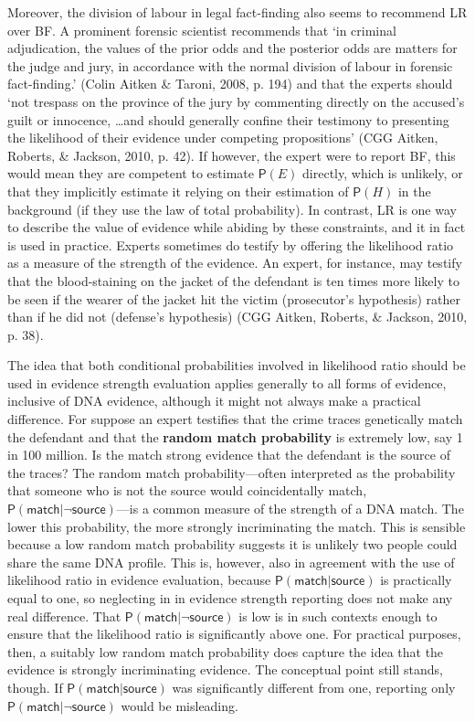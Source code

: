 \documentclass[
  10pt,
  dvipsnames,enabledeprecatedfontcommands]{scrartcl}
\newcommand{\pr}[1]{\mathsf{P}(#1)}
\begin{document}
Moreover, the division of labour in legal fact-finding also seems to
recommend \textsf{LR} over \textsf{BF}. A prominent forensic scientist
recommends that `in criminal adjudication, the values of the prior odds
and the posterior odds are matters for the judge and jury, in accordance
with the normal division of labour in forensic fact-finding.' (Colin
Aitken \& Taroni, 2008, p. 194) and that the experts should `not
trespass on the province of the jury by commenting directly on the
accused's guilt or innocence, \dots and should generally confine their
testimony to presenting the likelihood of their evidence under competing
propositions' (CGG Aitken, Roberts, \& Jackson, 2010, p. 42). If
however, the expert were to report \textsf{BF}, this would mean they are
competent to estimate \(\pr{E}\) directly, which is unlikely, or that
they implicitly estimate it relying on their estimation of \(\pr{H}\) in
the background (if they use the law of total probability). In contrast,
\textsf{LR} is one way to describe the value of evidence while abiding
by these constraints, and it in fact is used in practice. Experts
sometimes do testify by offering the likelihood ratio as a measure of
the strength of the evidence. An expert, for instance, may testify that
the blood-staining on the jacket of the defendant is ten times more
likely to be seen if the wearer of the jacket hit the victim
(prosecutor's hypothesis) rather than if he did not (defense's
hypothesis) (CGG Aitken, Roberts, \& Jackson, 2010, p. 38).

The idea that both conditional probabilities involved in likelihood
ratio should be used in evidence strength evaluation applies generally
to all forms of evidence, inclusive of DNA evidence, although it might
not always make a practical difference. For suppose an expert testifies
that the crime traces genetically match the defendant and that the
\textbf{random match probability} is extremely low, say 1 in 100
million. Is the match strong evidence that the defendant is the source
of the traces? The random match probability---often interpreted as the
probability that someone who is not the source would coincidentally
match, \(\pr{\textsf{match} \vert \neg \textsf{source}}\)---is a common
measure of the strength of a DNA match. The lower this probability, the
more strongly incriminating the match. This is sensible because a low
random match probability suggests it is unlikely two people could share
the same DNA profile. This is, however, also in agreement with the use
of likelihood ratio in evidence evaluation, because
\(\pr{\textsf{match} \vert \textsf{source}}\) is practically equal to
one, so neglecting in in evidence strength reporting does not make any
real difference. That \(\pr{\textsf{match} \vert \neg \textsf{source}}\)
is low is in such contexts enough to ensure that the likelihood ratio is
significantly above one. For practical purposes, then, a suitably low
random match probability does capture the idea that the evidence is
strongly incriminating evidence. The conceptual point still stands,
though. If \(\pr{\textsf{match} \vert \textsf{source}}\) was
significantly different from one, reporting only
\(\pr{\textsf{match} \vert \neg \textsf{source}}\) would be misleading.
\end{document}
